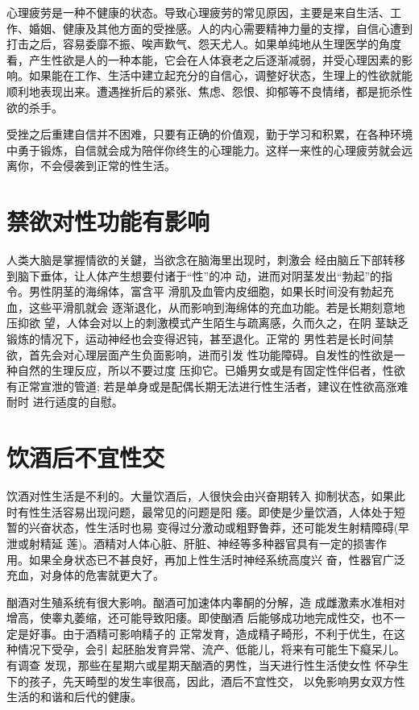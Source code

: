 \documentclass[12pt,UTF8]{ctexbook}
\begin{document}
心理疲劳是一种不健康的状态。导致心理疲劳的常见原因，主要是来自生活、工作、婚姻、健康及其他方面的受挫感。人的内心需要精神力量的支撑，自信心遭到打击之后，容易委靡不振、唉声歎气、怨天尤人。如果单纯地从生理医学的角度看，产生性欲是人的一种本能，它会在人体衰老之后逐渐减弱，并受心理因素的影响。如果能在工作、生活中建立起充分的自信心，调整好状态，生理上的性欲就能顺利地表现出来。遭遇挫折后的紧张、焦虑、怨恨、抑郁等不良情绪，都是扼杀性欲的杀手。

受挫之后重建自信并不困难，只要有正确的价值观，勤于学习和积累，在各种环境中勇于锻炼，自信就会成为陪伴你终生的心理能力。这样一来性的心理疲劳就会远离你，不会侵袭到正常的性生活。

\section{禁欲对性功能有影响}

人类大脑是掌握情欲的关鍵，当欲念在脑海里出现时，刺激会
经由脑丘下部转移到脑下垂体，让人体产生想要付诸于“性”的冲
动，进而对阴茎发出“勃起”的指令。男性阴茎的海绵体，富含平
滑肌及血管内皮细胞，如果长时间没有勃起充血，这些平滑肌就会
逐渐退化，从而影响到海绵体的充血功能。若是长期刻意地压抑欲
望，人体会对以上的刺激模式产生陌生与疏离感，久而久之，在阴
茎缺乏锻炼的情况下，运动神经也会变得迟钝，甚至退化。正常的
男性若是长时间禁欲，首先会对心理层面产生负面影响，进而引发
性功能障碍。自发性的性欲是一种自然的生理反应，所以不要过度
压抑它。已婚男女或是有固定性伴侣者，性欲有正常宣泄的管道;
若是单身或是配偶长期无法进行性生活者，建议在性欲高涨难耐时
进行适度的自慰。

\section{饮酒后不宜性交}

饮酒对性生活是不利的。大量饮酒后，人很快会由兴奋期转入
抑制状态，如果此时有性生活容易出现问题，最常见的问题是阳
痿。即使是少量饮酒，人体处于短暂的兴奋状态，性生活时也易
变得过分激动或粗野鲁莽，还可能发生射精障碍(早泄或射精延
莲)。酒精对人体心脏、肝脏、神经等多种器官具有一定的损害作
用。如果全身状态已不甚良好，再加上性生活时神经系统高度兴
奋，性器官广泛充血，对身体的危害就更大了。

酗酒对生殖系统有很大影响。酗酒可加速体内睾酮的分解，造
成雌激素水准相对增高，使睾丸萎缩，还可能导致阳痿。即使酗酒
后能够成功地完成性交，也不一定是好事。由于酒精可影响精子的
正常发育，造成精子畸形，不利于优生，在这种情况下受孕，会引
起胚胎发育异常、流产、低能儿，将来有可能生下癡呆儿。有调查
发现，那些在星期六或星期天酗酒的男性，当天进行性生活使女性
怀孕生下的孩子，先天畸型的发生率很高，因此，酒后不宜性交，
以免影响男女双方性生活的和谐和后代的健康。
\end{document}
